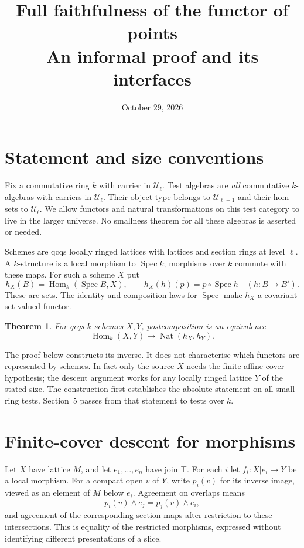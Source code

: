 \documentclass[11pt]{amsart}
\title[Full faithfulness of the functor of points]{Full faithfulness of the functor of points\\An informal proof and its interfaces}
\date{October 29, 2026}
\newtheorem{theorem}{Theorem}[section]
\theoremstyle{remark}\newtheorem{remark}[theorem]{Remark}
\newcommand{\Hom}{\operatorname{Hom}}
\newcommand{\Spec}{\operatorname{Spec}}
\newcommand{\Nat}{\operatorname{Nat}}
\newcommand{\UU}{\mathcal U}
\begin{document}
\maketitle

\section{Statement and size conventions}
Fix a commutative ring $k$ with carrier in $\UU_\ell$. Test algebras are
\emph{all} commutative $k$-algebras with carriers in $\UU_\ell$.
Their object type belongs to $\UU_{\ell+1}$ and their hom sets to
$\UU_\ell$. We allow functors and natural transformations on this test
category to live in the larger universe. No smallness theorem for all
these algebras is asserted or needed.

Schemes are qcqs locally ringed lattices with lattices and section rings
at level $\ell$. A $k$-structure is a local morphism to $\Spec k$;
morphisms over $k$ commute with these maps. For such a scheme $X$ put
\[
 h_X(B)=\Hom_k(\Spec B,X),\qquad
 h_X(h)(p)=p\circ\Spec h\quad(h:B\to B').
\]
These are sets. The identity and composition laws for $\Spec$ make
$h_X$ a covariant set-valued functor.

\begin{theorem}\label{thm:main}
For qcqs $k$-schemes $X,Y$, postcomposition is an equivalence
\[
 \Hom_k(X,Y)\longrightarrow\Nat(h_X,h_Y).
\]
\end{theorem}
The proof below constructs its inverse. It does not characterise which
functors are represented by schemes. In fact only the source $X$ needs
the finite affine-cover hypothesis; the descent argument works for any
locally ringed lattice $Y$ of the stated size.
The construction first establishes the absolute statement on all small
ring tests. Section~5 passes from that statement to tests over $k$.

\section{Finite-cover descent for morphisms}
Let $X$ have lattice $M$, and let $e_1,\ldots,e_n$ have join $\top$.
For each $i$ let $f_i:X|e_i\to Y$ be a local morphism. For a compact
open $v$ of $Y$, write $p_i(v)$ for its inverse image, viewed as an
element of $M$ below $e_i$. Agreement on overlaps means
\begin{equation}\label{eq:opens}
 p_i(v)\wedge e_j=p_j(v)\wedge e_i,
\end{equation}
and agreement of the corresponding section maps after restriction to
these intersections. This is equality of the restricted morphisms,
expressed without identifying different presentations of a slice.
\end{document}
